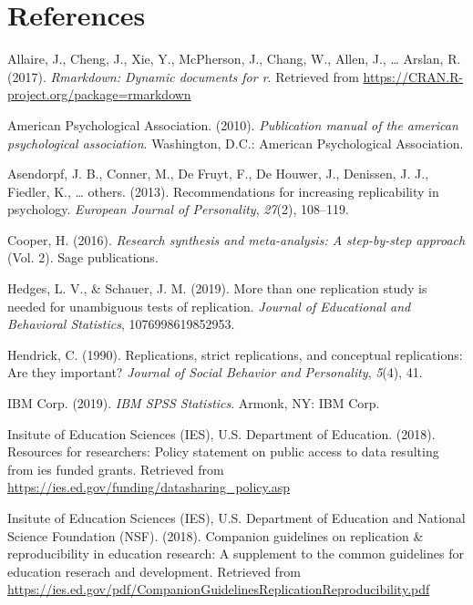 \documentclass[
  english,
  ,man]{apa6}
\newlength{\cslhangindent}
\newenvironment{cslreferences}%
  {\setlength{\parindent}{0pt}%
  \everypar{\setlength{\hangindent}{\cslhangindent}}\ignorespaces}%
  {\par}
\begin{document}
\newpage

\hypertarget{references}{%
\section{References}\label{references}}

\setlength{\parindent}{-0.5in}
\setlength{\leftskip}{0.5in}

\hypertarget{refs}{}
\begin{cslreferences}
\leavevmode\hypertarget{ref-rmarkdown}{}%
Allaire, J., Cheng, J., Xie, Y., McPherson, J., Chang, W., Allen, J., \ldots{} Arslan, R. (2017). \emph{Rmarkdown: Dynamic documents for r}. Retrieved from \url{https://CRAN.R-project.org/package=rmarkdown}

\leavevmode\hypertarget{ref-apa}{}%
American Psychological Association. (2010). \emph{Publication manual of the american psychological association}. Washington, D.C.: American Psychological Association.

\leavevmode\hypertarget{ref-asendorpf2013}{}%
Asendorpf, J. B., Conner, M., De Fruyt, F., De Houwer, J., Denissen, J. J., Fiedler, K., \ldots{} others. (2013). Recommendations for increasing replicability in psychology. \emph{European Journal of Personality}, \emph{27}(2), 108--119.

\leavevmode\hypertarget{ref-cooper2016}{}%
Cooper, H. (2016). \emph{Research synthesis and meta-analysis: A step-by-step approach} (Vol. 2). Sage publications.

\leavevmode\hypertarget{ref-hedges2019}{}%
Hedges, L. V., \& Schauer, J. M. (2019). More than one replication study is needed for unambiguous tests of replication. \emph{Journal of Educational and Behavioral Statistics}, 1076998619852953.

\leavevmode\hypertarget{ref-hendrick1990}{}%
Hendrick, C. (1990). Replications, strict replications, and conceptual replications: Are they important? \emph{Journal of Social Behavior and Personality}, \emph{5}(4), 41.

\leavevmode\hypertarget{ref-spss}{}%
IBM Corp. (2019). \emph{IBM SPSS Statistics}. Armonk, NY: IBM Corp.

\leavevmode\hypertarget{ref-iesdata}{}%
Insitute of Education Sciences (IES), U.S. Department of Education. (2018). Resources for researchers: Policy statement on public access to data resulting from ies funded grants. Retrieved from \url{https://ies.ed.gov/funding/datasharing_policy.asp}

\leavevmode\hypertarget{ref-iesrepro}{}%
Insitute of Education Sciences (IES), U.S. Department of Education and National Science Foundation (NSF). (2018). Companion guidelines on replication \& reproducibility in education research: A supplement to the common guidelines for education reserach and development. Retrieved from \url{https://ies.ed.gov/pdf/CompanionGuidelinesReplicationReproducibility.pdf}


\end{cslreferences}
\end{document}
